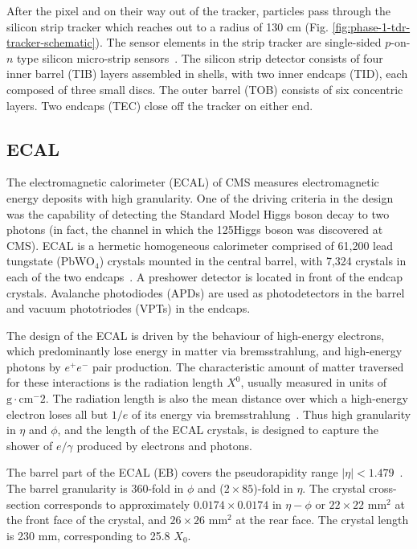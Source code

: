 After the pixel and on their way out of the tracker, particles pass through the silicon strip tracker which reaches out to a radius of 130 cm (Fig. \ref{fig:phase-1-tdr-tracker-schematic}). The sensor elements in the strip tracker are single-sided $p$-on-$n$ type silicon micro-strip sensors~\cite{CMS-2008-JINST-3-S08004}. The silicon strip detector consists of four inner barrel (TIB) layers assembled in shells, with two inner endcaps (TID), each composed of three small discs. The outer barrel (TOB) consists of six concentric layers. Two endcaps (TEC) close off the tracker on either end. 


\subsection{ECAL} 
The electromagnetic calorimeter (ECAL) of CMS measures electromagnetic energy deposits with high granularity. One of the driving criteria in the design was the capability of detecting the Standard Model Higgs boson decay to two photons (in fact, the channel in which the 125\GeV Higgs boson was discovered at CMS). 
ECAL is a hermetic homogeneous calorimeter comprised of 61,200 lead tungstate (PbWO$_4$) crystals mounted in the central barrel, with 7,324 crystals in each of the two endcaps~\cite{CMS-2008-JINST-3-S08004}. A preshower detector is located in front of the endcap crystals. Avalanche photodiodes (APDs) are used as photodetectors in the barrel and vacuum phototriodes (VPTs) in the endcaps. 

The design of the ECAL is driven by the behaviour of high-energy electrons, which predominantly lose energy in matter via bremsstrahlung, and high-energy photons by $e^+ e^-$ pair production. The characteristic amount of matter traversed for these interactions is the radiation length $X^0$, usually measured in units of $\text{g} \cdot \text{cm}^-2$. The radiation length is also the mean distance over which a high-energy electron loses all but $1/e$ of its energy via bremsstrahlung~\cite{workman_review_2022}. Thus high granularity in $\eta$ and $\phi$, and the length of the ECAL crystals, is designed to capture the shower of $e/\gamma$ produced by electrons and photons.

The barrel part of the ECAL (EB) covers the pseudorapidity range $|\eta| < 1.479$~\cite{CMS-2008-JINST-3-S08004}. The barrel granularity is 360-fold in $\phi$ and ($2 \times 85$)-fold in $\eta$. The crystal cross-section corresponds to approximately $0.0174 \times 0.0174$ in $\eta-\phi$ or $22 \times 22$ mm$^2$ at the front face of the crystal, and $26 \times 26$ mm$^2$ at the rear face. The crystal length is 230 mm, corresponding to 25.8 $X_0$.

